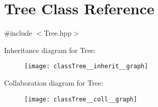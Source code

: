\hypertarget{classTree}{}\section{Tree Class Reference}
\label{classTree}


{\ttfamily \#include $<$Tree.\+hpp$>$}



Inheritance diagram for Tree\+:\nopagebreak
\begin{figure}[H]
\begin{center}
\leavevmode
\texttt{[image: classTree\_\_inherit\_\_graph]}
\end{center}
\end{figure}


Collaboration diagram for Tree\+:\nopagebreak
\begin{figure}[H]
\begin{center}
\leavevmode
\texttt{[image: classTree\_\_coll\_\_graph]}
\end{center}
\end{figure}
